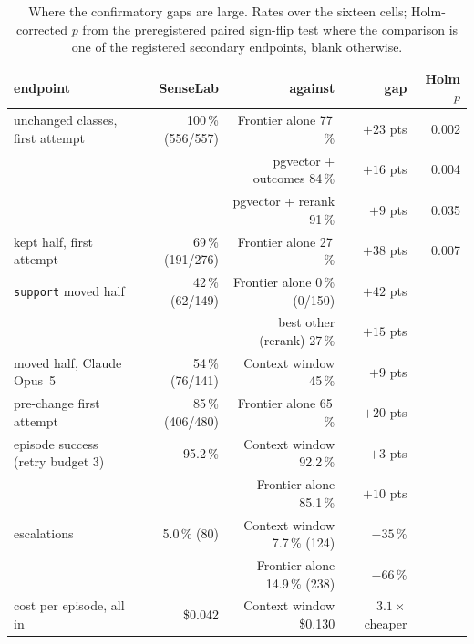 \documentclass[11pt]{article}
\newcommand{\code}[1]{\texttt{#1}}
\begin{document}
\begin{table}[t]
\centering\footnotesize
\caption{Where the confirmatory gaps are large. Rates over the sixteen cells; Holm-corrected
$p$ from the preregistered paired sign-flip test where the comparison is one of the registered
secondary endpoints, blank otherwise.}
\label{tab:gaps}
\setlength{\tabcolsep}{4pt}
\begin{tabular}{@{}lrrrr@{}}
\toprule
endpoint & SenseLab & against & gap & Holm $p$\\
\midrule
unchanged classes, first attempt    & 100\,\% (556/557) & Frontier alone 77\,\%          & $+23$ pts & 0.002\\
                                    &                     & pgvector + outcomes 84\,\%     & $+16$ pts & 0.004\\
                                    &                     & pgvector + rerank 91\,\%       & $+9$ pts  & 0.035\\
kept half, first attempt            & 69\,\% (191/276)  & Frontier alone 27\,\%          & $+38$ pts & 0.007\\
\code{support} moved half           & 42\,\% (62/149)   & Frontier alone 0\,\% (0/150)   & $+42$ pts & \\
                                    &                     & best other (rerank) 27\,\%     & $+15$ pts & \\
moved half, Claude Opus~5           & 54\,\% (76/141)   & Context window 45\,\%          & $+9$ pts  & \\
pre-change first attempt            & 85\,\% (406/480)  & Frontier alone 65\,\%          & $+20$ pts & \\
episode success (retry budget 3)    & 95.2\,\%          & Context window 92.2\,\%        & $+3$ pts  & \\
                                    &                     & Frontier alone 85.1\,\%        & $+10$ pts & \\
escalations                         & 5.0\,\% (80)      & Context window 7.7\,\% (124)   & $-35\,\%$ & \\
                                    &                     & Frontier alone 14.9\,\% (238)  & $-66\,\%$ & \\
cost per episode, all in            & \$0.042            & Context window \$0.130          & $3.1\times$ cheaper & \\
\bottomrule
\end{tabular}
\end{table}
\end{document}
